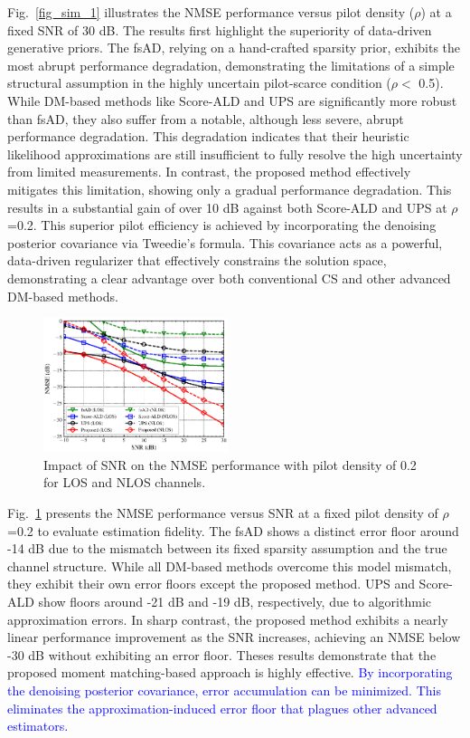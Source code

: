 \documentclass[lettersize,journal]{IEEEtran}
\newcommand{\tblue}{\textcolor{blue}}
\begin{document}
Fig.~\ref{fig_sim_1} illustrates the NMSE performance versus pilot density ($\rho$) at a fixed SNR of 30 dB. The results first highlight the superiority of data-driven generative priors. The fsAD, relying on a hand-crafted sparsity prior, exhibits the most abrupt performance degradation, demonstrating the limitations of a simple structural assumption in the highly uncertain pilot-scarce condition ($\rho<$ 0.5).
While DM-based methods like Score-ALD and UPS are significantly more robust than fsAD, they also suffer from a notable, although less severe, abrupt performance degradation. This degradation indicates that their heuristic likelihood approximations are still insufficient to fully resolve the high uncertainty from limited measurements.
In contrast, the proposed method effectively mitigates this limitation, showing only a gradual performance degradation. This results in a substantial gain of over 10 dB against both Score-ALD and UPS at $\rho$=0.2. This superior pilot efficiency is achieved by incorporating the denoising posterior covariance via Tweedie's formula. This covariance acts as a powerful, data-driven regularizer that effectively constrains the solution space, demonstrating a clear advantage over both conventional CS and other advanced DM-based methods.

\begin{figure}[!t]
\includegraphics[width=0.48\textwidth]{images/20251014/fig_2.eps}
\caption{Impact of SNR on the NMSE performance with pilot density of 0.2 for LOS and NLOS channels.}
\label{fig_sim_2}
\end{figure}

Fig.~\ref{fig_sim_2} presents the NMSE performance versus SNR at a fixed pilot density of $\rho$=0.2 to evaluate estimation fidelity. The fsAD shows a distinct error floor around -14 dB due to the mismatch between its fixed sparsity assumption and the true channel structure. While all DM-based methods overcome this model mismatch, they exhibit their own error floors except the proposed method. UPS and Score-ALD show floors around -21 dB and -19 dB, respectively, due to algorithmic approximation errors. In sharp contrast, the proposed method exhibits a nearly linear performance improvement as the SNR increases, achieving an NMSE below -30 dB without exhibiting an error floor. Theses results demonstrate that the proposed moment matching-based approach is highly effective. \tblue{By incorporating the denoising posterior covariance, error accumulation can be minimized. This eliminates the approximation-induced error floor that plagues other advanced estimators.} %
\end{document}
